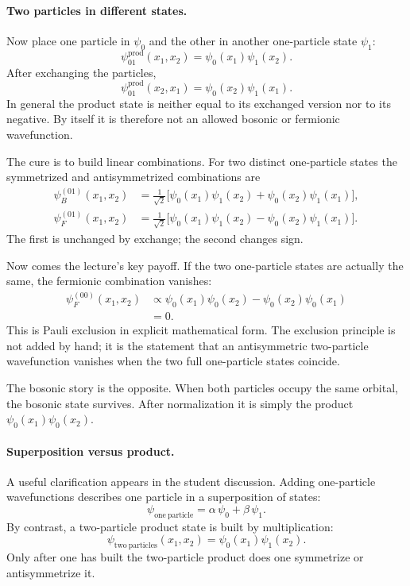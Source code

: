 \paragraph{Two particles in different states.}

Now place one particle in \(\psi_0\) and the other in another one-particle state \(\psi_1\):
\begin{equation}
\psi^{\mathrm{prod}}_{01}(x_1,x_2)=\psi_0(x_1)\psi_1(x_2).
\end{equation}
After exchanging the particles,
\begin{equation}
\psi^{\mathrm{prod}}_{01}(x_2,x_1)=\psi_0(x_2)\psi_1(x_1).
\end{equation}
In general the product state is neither equal to its exchanged version nor to its negative. By itself it is therefore not an allowed bosonic or fermionic wavefunction.

The cure is to build linear combinations. For two distinct one-particle states the symmetrized and antisymmetrized combinations are
\begin{align}
\psi_B^{(01)}(x_1,x_2)
&=\frac{1}{\sqrt2}\Big[\psi_0(x_1)\psi_1(x_2)+\psi_0(x_2)\psi_1(x_1)\Big], \\
\psi_F^{(01)}(x_1,x_2)
&=\frac{1}{\sqrt2}\Big[\psi_0(x_1)\psi_1(x_2)-\psi_0(x_2)\psi_1(x_1)\Big].
\end{align}
The first is unchanged by exchange; the second changes sign.

Now comes the lecture's key payoff. If the two one-particle states are actually the same, the fermionic combination vanishes:
\begin{align}
\psi_F^{(00)}(x_1,x_2)
&\propto \psi_0(x_1)\psi_0(x_2)-\psi_0(x_2)\psi_0(x_1) \\
&=0.
\end{align}
This is Pauli exclusion in explicit mathematical form. The exclusion principle is not added by hand; it is the statement that an antisymmetric two-particle wavefunction vanishes when the two full one-particle states coincide.

The bosonic story is the opposite. When both particles occupy the same orbital, the bosonic state survives. After normalization it is simply the product \(\psi_0(x_1)\psi_0(x_2)\).

\paragraph{Superposition versus product.}

A useful clarification appears in the student discussion. Adding one-particle wavefunctions describes one particle in a superposition of states:
\begin{equation}
\psi_{\mathrm{one\ particle}}=\alpha\,\psi_0+\beta\,\psi_1.
\end{equation}
By contrast, a two-particle product state is built by multiplication:
\begin{equation}
\psi_{\mathrm{two\ particles}}(x_1,x_2)=\psi_0(x_1)\psi_1(x_2).
\end{equation}
Only after one has built the two-particle product does one symmetrize or antisymmetrize it.

